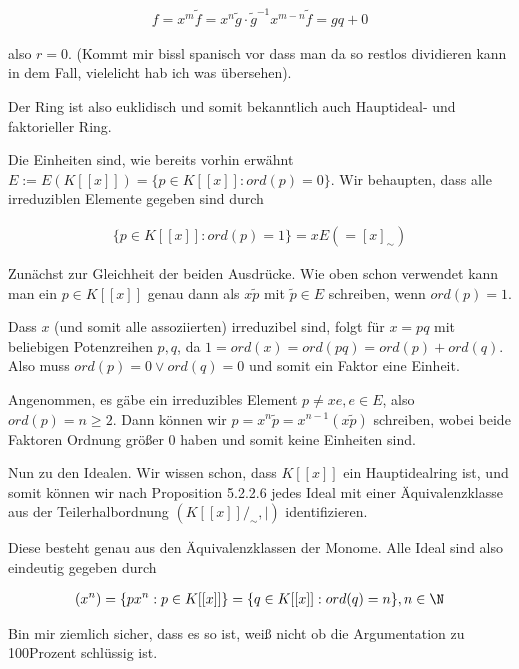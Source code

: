 \begin{solution}
\begin{align*}
  f = x^m \tilde{f} = x^n\tilde{g} \cdot \tilde{g}^{-1}x^{m-n}\tilde{f} = gq + 0
\end{align*}

also $r = 0$. (Kommt mir bissl spanisch vor dass man da so restlos dividieren kann in dem Fall, vielelicht hab ich was übersehen).

Der Ring ist also euklidisch und somit bekanntlich auch Hauptideal- und faktorieller Ring.

Die Einheiten sind, wie bereits vorhin erwähnt $E := E(K[[x]]) = \{p \in K[[x]]: ord(p) = 0\}$. Wir behaupten, dass alle irreduziblen Elemente gegeben sind durch

\begin{align*}
  \{p \in K[[x]]: ord(p) = 1\} = xE ( = [x]_{\sim})
\end{align*}

Zunächst zur Gleichheit der beiden Ausdrücke. Wie oben schon verwendet kann man ein $p \in K[[x]]$ genau dann als $x\tilde{p}$ mit $\tilde{p} \in E$ schreiben, wenn $ord(p) = 1$.

Dass $x$ (und somit alle assoziierten) irreduzibel sind, folgt für $x = pq$ mit beliebigen Potenzreihen $p,q$, da $1 = ord(x) = ord(pq) = ord(p) + ord(q)$. Also muss $ord(p) = 0 \lor ord(q) = 0$ und somit ein Faktor eine Einheit.

Angenommen, es gäbe ein irreduzibles Element $p \neq xe, e \in E$, also $ord(p) = n \geq 2$. Dann können wir $p = x^n\tilde{p} = x^{n-1} (x\tilde{p})$ schreiben, wobei beide Faktoren Ordnung größer 0 haben und somit keine Einheiten sind.

Nun zu den Idealen. Wir wissen schon, dass $K[[x]]$ ein Hauptidealring ist, und somit können wir nach Proposition 5.2.2.6 jedes Ideal mit einer Äquivalenzklasse aus der Teilerhalbordnung $(K[[x]]/_{\sim},|)$ identifizieren.

Diese besteht genau aus den Äquivalenzklassen der Monome. Alle Ideal sind also eindeutig gegeben durch

\begin{align*}
  (x^n) = \{px^n: p \in K[[x]]\} = \{q \in K[[x]]: ord(q) = n\}, n \in \N
\end{align*}

Bin mir ziemlich sicher, dass es so ist, weiß nicht ob die Argumentation zu 100Prozent schlüssig ist.


\end{solution}
